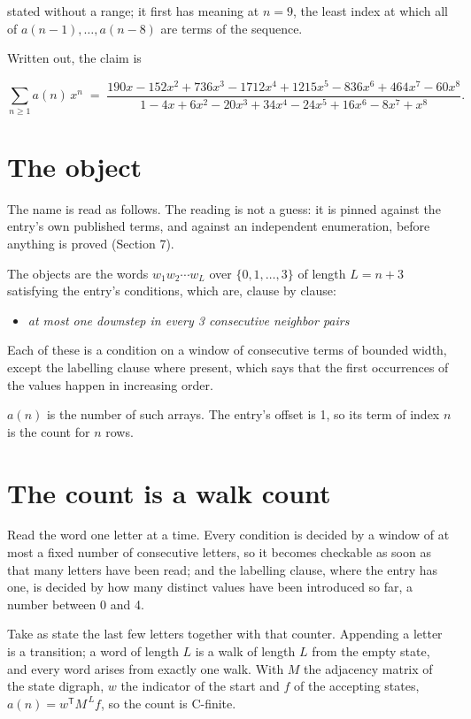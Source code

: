 \documentclass[11pt]{article}
\theoremstyle{definition}
\begin{document}
stated without a range; it first has meaning at $n = 9$, the least index at which all of $a(n-1),\dots,a(n-8)$ are terms of the sequence.

Written out, the claim is

\[\sum_{n \ge 1} a(n)\,x^n \;=\; \frac{190x - 152x^{2} + 736x^{3} - 1712x^{4} + 1215x^{5} - 836x^{6} + 464x^{7} - 60x^{8}}{1 - 4x + 6x^{2} - 20x^{3} + 34x^{4} - 24x^{5} + 16x^{6} - 8x^{7} + x^{8}}.\]

\section{The object}

The name is read as follows. The reading is not a guess: it is pinned against the entry's own published terms, and against an independent enumeration, before anything is proved (Section 7).

The objects are the words $w_1 w_2 \cdots w_L$ over $\{0,1,\dots,3\}$ of length $L = n + 3$ satisfying the entry's conditions, which are, clause by clause:

\begin{itemize}

\item {\itshape at most one downstep in every 3 consecutive neighbor pairs}

\end{itemize}

Each of these is a condition on a window of consecutive terms of bounded width, except the labelling clause where present, which says that the first occurrences of the values happen in increasing order.

$a(n)$ is the number of such arrays. The entry's offset is 1, so its term of index $n$ is the count for $n$ rows.

\section{The count is a walk count}

Read the word one letter at a time. Every condition is decided by a window of at most a fixed number of consecutive letters, so it becomes checkable as soon as that many letters have been read; and the labelling clause, where the entry has one, is decided by how many distinct values have been introduced so far, a number between $0$ and 4.

Take as state the last few letters together with that counter. Appending a letter is a transition; a word of length $L$ is a walk of length $L$ from the empty state, and every word arises from exactly one walk. With $M$ the adjacency matrix of the state digraph, $w$ the indicator of the start and $f$ of the accepting states, $a(n) = w^{\mathsf T}M^{\,L}f$, so the count is C-finite.
\end{document}
